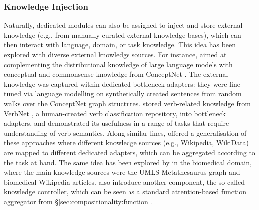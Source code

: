 
\subsubsection{Knowledge Injection}
\label{ss:knowledge_injection}
Naturally, dedicated modules can also be assigned to inject and store external knowledge (e.g., from manually curated external knowledge bases), which can then interact with language, domain, or task knowledge. This idea has been explored with diverse external knowledge sources. For instance, \citet{lauscher-etal-2020-common} aimed at complementing the distributional knowledge of large language models with conceptual and commonsense knowledge from ConceptNet \citep{Speer:2017conceptnet}. The external knowledge was captured within dedicated bottleneck adapters: they were fine-tuned via language modelling on synthetically created sentences from random walks over the ConceptNet graph structures. \cite{majewska-etal-2021-verb} stored verb-related knowledge from VerbNet \citep{schuler2005verbnet}, a human-created verb classification repository, into bottleneck adapters, and demonstrated its usefulness in a range of tasks that require understanding of verb semantics. Along similar lines, \citet{wang-etal-2021-k} offered a generalisation of these approaches where different knowledge sources (e.g., Wikipedia, WikiData) are mapped to different dedicated adapters, which can be aggregated according to the task at hand. The same idea has been explored by \citet{Lu:2021knowledge} in the biomedical domain, where the main knowledge sources were the UMLS Metathesaurus graph \citep{bodenreider2004unified} and biomedical Wikipedia articles. \citet{Lu:2021knowledge} also introduce another component, the so-called knowledge controller, which can be seen as a standard attention-based function aggregator from \S\ref{sec:compositionality:function}. 

